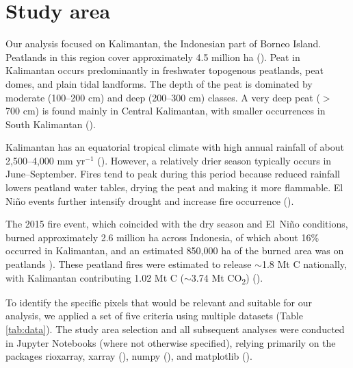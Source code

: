\documentclass[
  fontsize=12pt,
  paper=a4,
  parskip=half,
  headings=big,
  DIV=12
]{scrreprt}
\begin{document}
\section{Study area}

Our analysis focused on Kalimantan, the Indonesian part of Borneo Island. Peatlands in this region cover approximately 4.5 million ha ({\cite{anshari_peatland_2026}}). Peat in Kalimantan occurs predominantly in freshwater topogenous peatlands, peat domes, and plain tidal landforms. The depth of the peat is dominated by moderate (100–200 cm) and deep (200–300 cm) classes. A very deep peat ($>$ 700 cm) is found mainly in Central Kalimantan, with smaller occurrences in South Kalimantan (\cite{anda_revisiting_2021}).

Kalimantan has an equatorial tropical climate with high annual rainfall of about 2,500--4,000 mm yr$^{-1}$ (\cite{nurlatifah_drought_2023}). However, a relatively drier season typically occurs in June--September. Fires tend to peak during this period because reduced rainfall lowers peatland water tables, drying the peat and making it more flammable. El Niño events further intensify drought and increase fire occurrence (\cite{schmidt_fire_2024}).

The 2015 fire event, which coincided with the dry season and El~Niño conditions, burned approximately 2.6 million ha across Indonesia, of which about 16\% occurred in Kalimantan, and an estimated 850,000 ha of the burned area was on peatlands \cite{world_bank_group_cost_2016}). These peatland fires were estimated to release $\sim$1.8 Mt C nationally, with Kalimantan contributing 1.02 Mt C ($\sim$3.74 Mt CO\textsubscript{2}) (\cite{setyawati_carbon_2018}).

To identify the specific pixels that would be relevant and suitable for our analysis, we applied a set of five criteria using multiple datasets (Table \ref{tab:data}). The study area selection and all subsequent analyses were conducted in Jupyter Notebooks (where not otherwise specified), relying primarily on the packages rioxarray, xarray (\cite{hoyer_xarray_2017}), numpy (\cite{harris_array_2020}), and matplotlib (\cite{hunter_matplotlib_2007}).
\end{document}
